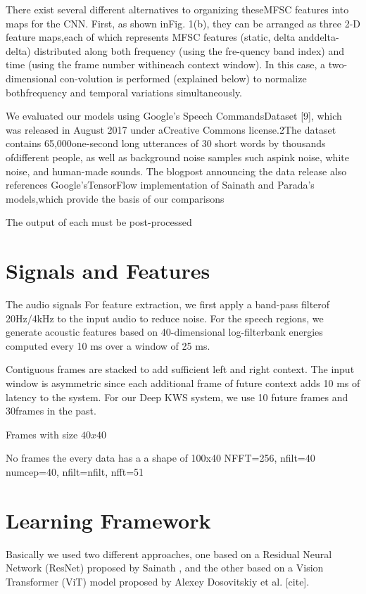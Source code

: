 There exist several different alternatives to organizing theseMFSC features into maps for the CNN. First, as shown inFig. 1(b), they can be arranged as three 2-D feature maps,each of which represents MFSC features (static, delta anddelta-delta) distributed along both frequency (using the fre-quency band index) and time (using the frame number withineach context window). In this case, a two-dimensional con-volution is performed (explained below) to normalize bothfrequency and temporal variations simultaneously. 


We evaluated our models using Google’s Speech CommandsDataset  [9],  which  was  released  in  August  2017  under  aCreative  Commons  license.2The  dataset  contains  65,000one-second long utterances of 30 short words by thousands ofdifferent people, as well as background noise samples such aspink noise, white noise, and human-made sounds.  The blogpost  announcing  the  data  release  also  references  Google’sTensorFlow implementation of Sainath and Parada’s models,which provide the basis of our comparisons


The output of each must be post-processed

\section{Signals and Features}
The audio signals For  feature  extraction,   we  first  apply  a  band-pass  filterof  20Hz/4kHz  to  the  input  audio  to  reduce  noise.    For the speech regions, we generate acoustic features based on 40-dimensional log-filterbank energies computed every 10 ms over a window of 25 ms. 
    

Contiguous frames are stacked to add sufficient left and right context. The input window is asymmetric since each additional frame of future context adds 10 ms of latency to the system. For our Deep KWS system, we use 10 future frames and 30frames in the past.


Frames with size $40x40$

No frames the every data has a a shape of 100x40
NFFT=256, nfilt=40
numcep=40, nfilt=nfilt, nfft=51

\section{Learning Framework}
 
 Basically we used two different approaches, one based on a Residual Neural Network (ResNet) proposed by Sainath \cite{sainath2013deep}, \cite{tang2018deep} and the other based on a Vision Transformer (ViT) model proposed by Alexey Dosovitskiy et al. [cite].


